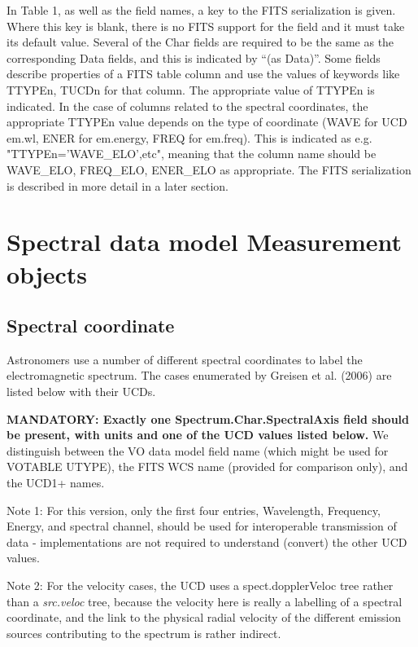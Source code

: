 \documentclass[11pt]{article}
\newcommand{\htwidth}[1]{}
\begin{document}
In Table 1, as well as the field names, a key to the FITS serialization is given.
Where this key is blank, there is no FITS support for the field and it must take its default value.
Several of the Char fields are required to be the same as the corresponding Data fields,
and this is indicated by ``(as Data)''. Some fields describe properties of a FITS table
column and use the values of keywords like TTYPEn, TUCDn for that column.
The appropriate value of TTYPEn is indicated. In the case of columns related to
the spectral coordinates, the appropriate TTYPEn value depends on the type of coordinate
(WAVE for UCD em.wl, ENER for em.energy, FREQ for em.freq). This is indicated as
e.g. "TTYPEn='WAVE\_ELO',etc", meaning that the column name should be WAVE\_ELO, FREQ\_ELO,
ENER\_ELO as appropriate.
The FITS serialization is described in more detail in a later section.






\section{Spectral data model Measurement objects}

\subsection{Spectral coordinate}

Astronomers use a number of different spectral coordinates
to label the electromagnetic spectrum. The cases enumerated
by Greisen et al. (2006) are listed below with their UCDs.

{\bf MANDATORY: Exactly one Spectrum.Char.SpectralAxis field should be present,
with units and one of the UCD values listed below.}
We distinguish between the VO data model field name (which might
be used for VOTABLE UTYPE),
the FITS WCS name (provided for comparison only), and the UCD1+ names.

Note 1: For this version, only the first four entries, Wavelength,
Frequency, Energy, and spectral channel, should be used for
interoperable transmission of data - implementations are not required to
understand (convert) the other UCD values. 

Note 2: For the velocity cases, the UCD uses a spect.dopplerVeloc tree
rather than a {\it src.veloc } tree, because the velocity here
is really a labelling of a spectral coordinate, and the link to
the physical radial velocity of the different emission sources contributing
to the spectrum is rather indirect.
\end{document}
